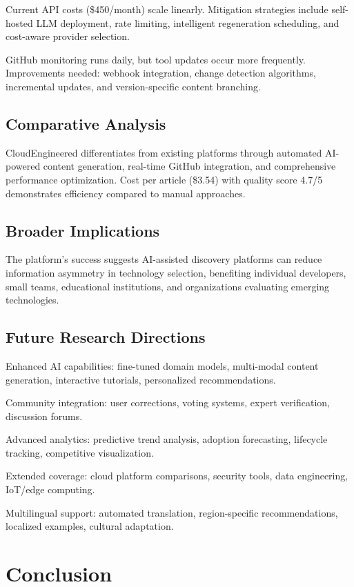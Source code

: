 \documentclass[conference]{IEEEtran}
\begin{document}
Current API costs (\$450/month) scale linearly. Mitigation strategies include self-hosted LLM deployment, rate limiting, intelligent regeneration scheduling, and cost-aware provider selection.

GitHub monitoring runs daily, but tool updates occur more frequently. Improvements needed: webhook integration, change detection algorithms, incremental updates, and version-specific content branching.

\subsection{Comparative Analysis}

CloudEngineered differentiates from existing platforms through automated AI-powered content generation, real-time GitHub integration, and comprehensive performance optimization. Cost per article (\$3.54) with quality score 4.7/5 demonstrates efficiency compared to manual approaches.

\subsection{Broader Implications}

The platform's success suggests AI-assisted discovery platforms can reduce information asymmetry in technology selection, benefiting individual developers, small teams, educational institutions, and organizations evaluating emerging technologies.

\subsection{Future Research Directions}

Enhanced AI capabilities: fine-tuned domain models, multi-modal content generation, interactive tutorials, personalized recommendations.

Community integration: user corrections, voting systems, expert verification, discussion forums.

Advanced analytics: predictive trend analysis, adoption forecasting, lifecycle tracking, competitive visualization.

Extended coverage: cloud platform comparisons, security tools, data engineering, IoT/edge computing.

Multilingual support: automated translation, region-specific recommendations, localized examples, cultural adaptation.

\section{Conclusion}
\end{document}
